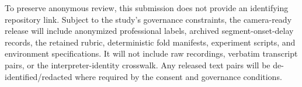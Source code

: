 To preserve anonymous review, this submission does not provide an identifying repository link. Subject to the study's governance constraints, the camera-ready release will include anonymized professional labels, archived segment-onset-delay records, the retained rubric, deterministic fold manifests, experiment scripts, and environment specifications. It will not include raw recordings, verbatim transcript pairs, or the interpreter-identity crosswalk. Any released text pairs will be de-identified/redacted where required by the consent and governance conditions.

